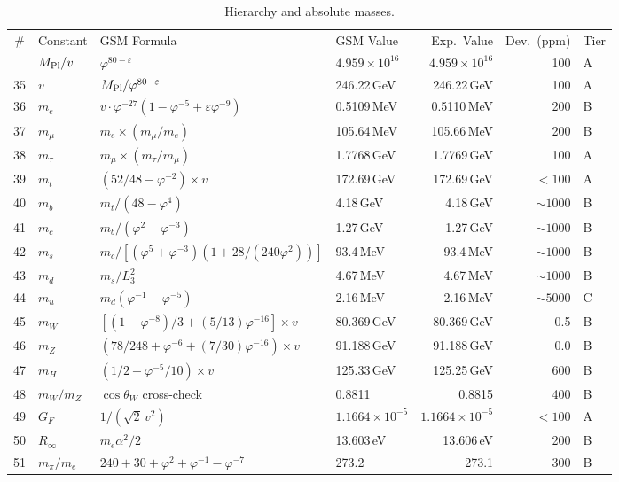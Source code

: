 \documentclass[aps,prd,twocolumn,superscriptaddress,nofootinbib,showpacs]{revtex4-2}
\newcommand{\Mpl}{M_{\rm Pl}}
\begin{document}
\begin{table}[t]
\caption{\label{tab:hierarchy}Hierarchy and absolute masses.}
\begin{ruledtabular}
\begin{tabular}{clllrrl}
\# & Constant & GSM Formula & GSM Value & Exp.\ Value & Dev.\ (ppm) & Tier \\
\colrule
34 & $\Mpl/v$ & $\varphi^{80-\varepsilon}$ & $4.959\!\times\!10^{16}$ & $4.959\!\times\!10^{16}$ & 100 & A \\
35 & $v$ & $\Mpl/\varphi^{80-\varepsilon}$ & 246.22\,GeV & 246.22\,GeV & 100 & A \\
36 & $m_e$ & $v\cdot\varphi^{-27}(1-\varphi^{-5}+\varepsilon\varphi^{-9})$ & 0.5109\,MeV & 0.5110\,MeV & 200 & B \\
37 & $m_\mu$ & $m_e\times(m_\mu/m_e)$ & 105.64\,MeV & 105.66\,MeV & 200 & B \\
38 & $m_\tau$ & $m_\mu\times(m_\tau/m_\mu)$ & 1.7768\,GeV & 1.7769\,GeV & 100 & A \\
39 & $m_t$ & $(52/48-\varphi^{-2})\times v$ & 172.69\,GeV & 172.69\,GeV & $<100$ & A \\
40 & $m_b$ & $m_t/(48-\varphi^4)$ & 4.18\,GeV & 4.18\,GeV & $\sim1000$ & B \\
41 & $m_c$ & $m_b/(\varphi^2+\varphi^{-3})$ & 1.27\,GeV & 1.27\,GeV & $\sim1000$ & B \\
42 & $m_s$ & $m_c/[(\varphi^5\!+\!\varphi^{-3})(1\!+\!28/(240\varphi^2))]$ & 93.4\,MeV & 93.4\,MeV & $\sim1000$ & B \\
43 & $m_d$ & $m_s/L_3^2$ & 4.67\,MeV & 4.67\,MeV & $\sim1000$ & B \\
44 & $m_u$ & $m_d(\varphi^{-1}-\varphi^{-5})$ & 2.16\,MeV & 2.16\,MeV & $\sim5000$ & C \\
45 & $m_W$ & $[(1-\varphi^{-8})/3+(5/13)\varphi^{-16}]\times v$ & 80.369\,GeV & 80.369\,GeV & 0.5 & B \\
46 & $m_Z$ & $(78/248+\varphi^{-6}+(7/30)\varphi^{-16})\times v$ & 91.188\,GeV & 91.188\,GeV & 0.0 & B \\
47 & $m_H$ & $(1/2+\varphi^{-5}/10)\times v$ & 125.33\,GeV & 125.25\,GeV & 600 & B \\
48 & $m_W/m_Z$ & $\cos\theta_W$ cross-check & 0.8811 & 0.8815 & 400 & B \\
49 & $G_F$ & $1/(\sqrt{2}\,v^2)$ & $1.1664\!\times\!10^{-5}$ & $1.1664\!\times\!10^{-5}$ & $<100$ & A \\
50 & $R_\infty$ & $m_e\alpha^2/2$ & 13.603\,eV & 13.606\,eV & 200 & B \\
51 & $m_\pi/m_e$ & $240+30+\varphi^2+\varphi^{-1}-\varphi^{-7}$ & 273.2 & 273.1 & 300 & B \\
\end{tabular}
\end{ruledtabular}
\end{table}
\end{document}

